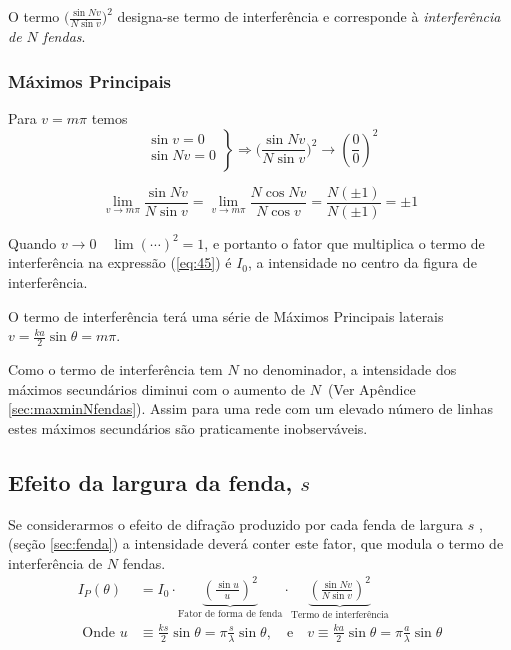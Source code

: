 \documentclass[a4paper,12pt]{article}
\begin{document}
O termo $\big( \frac{\sin N v }{N \sin v} \big)^2$ designa-se termo de interferência e corresponde à \emph{interferência de $N$ fendas}.

\subsubsection{Máximos Principais}
Para $ v = m \pi$ temos 
\begin{equation*}
 \left.
	\begin{array}{rl} 
			\sin v =0 \\
			\sin Nv =0 \\			
	\end{array} \right\} 
  \Rightarrow \big( \frac{\sin N v }{N \sin v} \big)^2 \to \left( \frac{0 }{0} \right)^2 
\end{equation*}


\begin{equation}
	\label{eq:46} \lim_{v \rightarrow m \pi} \frac{\sin N v}{N \sin v} = \lim_{v \rightarrow m \pi} \frac{N \cos N v}{N \cos v} =\frac{N (\pm 1)}{N (\pm 1)} = \pm 1 
\end{equation}

Quando $v \rightarrow 0 \quad \lim (\cdots)^2  =  1$, %
e portanto o fator que multiplica o termo de interferência na expressão (\ref{eq:45}) é  $I_0$, a intensidade no centro da figura  de interferência.

O termo de interferência terá uma série de Máximos Principais laterais $ v = \frac{k a }{2} \sin \theta = m \pi$. 

Como o termo de interferência tem $N$ no denominador, a intensidade dos máximos secundários diminui com o aumento de $N\,$ (Ver Apêndice \ref{sec:maxminNfendas}). 
Assim para uma rede com um elevado número de linhas estes máximos secundários são praticamente inobserváveis.

\subsection{\sf Efeito da largura da fenda, $s$}

Se considerarmos o efeito de difração produzido por cada fenda de largura $s$ , (seção \ref{sec:fenda})  
a intensidade deverá conter este fator, que modula o termo de interferência de $N$ fendas.
\begin{align}
I_P(\theta) &= I_0 \cdot \underbrace{\left( \frac{\sin u}{u} \right)^2}_\text{Fator de forma de fenda}
	\cdot  \underbrace{ \left( \frac{\sin N v}{N \sin  v} \right)^2 }_\text{Termo de interferência} \nonumber \\
\text{ Onde } u &\equiv \frac{ k s}{2} \sin \theta =  \pi \frac{ s}{\lambda} \sin \theta , \quad \text{e} \quad
v \equiv  \frac{ k a}{2} \sin \theta =  \pi \frac{a}{\lambda} \sin \theta 
\end{align}
\end{document}
